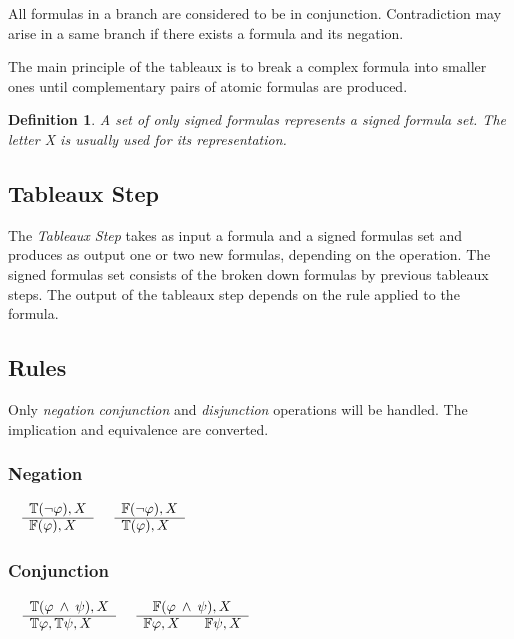 \documentclass{article}
\newtheorem{defn}{Definition}[section]
\newcommand{\signT}{\mathbb{T}}
\newcommand{\signF}{\mathbb{F}}
\begin{document}
	All formulas in a branch are considered to be in conjunction. Contradiction may arise in a same branch if there exists a formula and its negation.

	The main principle of the tableaux is to break a complex formula into smaller ones until complementary pairs of atomic formulas are produced.

	\begin{defn}
		A set of only signed formulas represents a signed formula set. The letter \textit{X} is usually used for its representation.
	\end{defn}

	\subsection{Tableaux Step}
	The \textit{Tableaux Step} takes as input a formula and a signed formulas set and produces as output one or two new formulas, depending on the operation.
	The signed formulas set consists of the broken down formulas by previous tableaux steps.
	The output of the tableaux step depends on the rule applied to the formula.

	\subsection{Rules}
	Only \textit{negation} \textit{conjunction} and \textit{disjunction} operations will be handled. The implication and equivalence are converted.

		\subsubsection*{Negation}
			$\begin{array}{rl}
				& \signT(\neg \varphi), X \\
			      \cline{2-2}
			      & \signF(\varphi), X
			\end{array}$
			\:\:\:\:\:\:\:\:\:\:\:\:\:\:\:\:\:\:\:\:\:\:\:\:\:\:\:\:\:\:\:\:\:\:\:\:\:\:\:\:\:\:\:\:\:\:\:\:
			$\begin{array}{rl}
				& \signF(\neg \varphi), X \\
			      \cline{2-2}
			      & \signT(\varphi), X
			\end{array}$

		\subsubsection*{Conjunction}
			$\begin{array}{rl}
				& \signT(\varphi \: \wedge \: \psi), X \\
			      \cline{2-2}
			      & \signT\varphi, \signT\psi, X
			\end{array}$
			\:\:\:\:\:\:\:\:\:\:\:\:\:\:\:\:\:\:\:\:\:\:\:\:\:\:\:\:\:\:\:\:\:\:\:
			$\begin{array}{rl}
				& \:\:\: \signF(\varphi \: \wedge \: \psi), X \\
			      \cline{2-2}
			      & \signF\varphi, X \:\:\:\:\:\:\:\: \signF\psi, X
			\end{array}$
\end{document}
